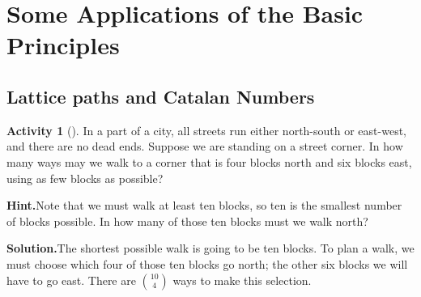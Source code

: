 \documentclass[10pt,]{book}
\theoremstyle{plain}
\theoremstyle{definition}
\newtheorem{activity}[project]{Activity}
\numberwithin{equation}{chapter}
\begin{document}
\section[{Some Applications of the Basic Principles}]{Some Applications of the Basic Principles}\label{section-3}
\typeout{************************************************}
\typeout{************************************************}
\subsection[{Lattice paths and Catalan Numbers}]{Lattice paths and Catalan Numbers}\label{subsection-7}
\begin{activity}[]\label{blockwalking}
In a part of a city, all streets run either north-south or east-west, and there are no dead ends. Suppose we are standing on a street corner. In how many ways may we walk to a corner that is four blocks north and six blocks east, using as few blocks as possible?%
\par\medskip\noindent%
\textbf{Hint.}\quad Note that we must walk at least ten blocks, so ten is the smallest number of blocks possible. In how many of those ten blocks must we walk north?%
\par\medskip\noindent%
\textbf{Solution.}\quad The shortest possible walk is going to be ten blocks. To plan a walk, we must choose which four of those ten blocks go north; the other six blocks we will have to go east. There are \(\binom{10}{4}\) ways to make this selection.%
\end{activity}
\end{document}
